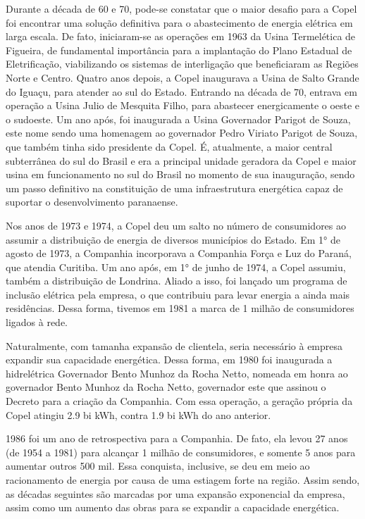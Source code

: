 \documentclass[grad,numbers]{coppe}
\begin{document}
  Durante a década de 60 e 70, pode-se constatar que o maior desafio para a Copel foi encontrar uma solução definitiva para o abastecimento de energia elétrica em larga escala. De fato, iniciaram-se as operações em 1963 da Usina Termelética de Figueira, de fundamental importância para a implantação do Plano Estadual de Eletrificação, viabilizando os sistemas de interligação que beneficiaram as Regiões Norte e Centro. Quatro anos depois, a Copel inaugurava a Usina de Salto Grande do Iguaçu, para atender ao sul do Estado. Entrando na década de 70, entrava em operação a Usina Julio de Mesquita Filho, para abastecer energicamente o oeste e o sudoeste. Um ano após, foi inaugurada a Usina Governador Parigot de Souza, este nome sendo uma homenagem ao governador Pedro Viriato Parigot de Souza, que também tinha sido presidente da Copel. É, atualmente, a maior central subterrânea do sul do Brasil e era a principal unidade geradora da Copel e maior usina em funcionamento no sul do Brasil no momento de sua inauguração, sendo um passo definitivo na constituição de uma infraestrutura energética capaz de suportar o desenvolvimento paranaense.

  Nos anos de 1973 e 1974, a Copel deu um salto no número de consumidores ao assumir a distribuição de energia de diversos municípios do Estado. Em 1° de agosto de 1973, a Companhia incorporava a Companhia Força e Luz do Paraná, que atendia Curitiba. Um ano após, em 1° de junho de 1974, a Copel assumiu, também a distribuição de Londrina. Aliado a isso, foi lançado um programa de inclusão elétrica pela empresa, o que contribuiu para levar energia a ainda mais residências. Dessa forma, tivemos em 1981 a marca de 1 milhão de consumidores ligados à rede.

  Naturalmente, com tamanha expansão de clientela, seria necessário à empresa expandir sua capacidade energética. Dessa forma, em 1980 foi inaugurada a hidrelétrica Governador Bento Munhoz da Rocha Netto, nomeada em honra ao governador Bento Munhoz da Rocha Netto, governador este que assinou o Decreto para a criação da Companhia. Com essa operação, a geração própria da Copel atingiu 2.9 bi kWh, contra 1.9 bi kWh do ano anterior.

  1986 foi um ano de retrospectiva para a Companhia. De fato, ela levou 27 anos (de 1954 a 1981) para alcançar 1 milhão de consumidores, e somente 5 anos para aumentar outros 500 mil. Essa conquista, inclusive, se deu em meio ao racionamento de energia por causa de uma estiagem forte na região. Assim sendo, as décadas seguintes são marcadas por uma expansão exponencial da empresa, assim como um aumento das obras para se expandir a capacidade energética.
\end{document}
